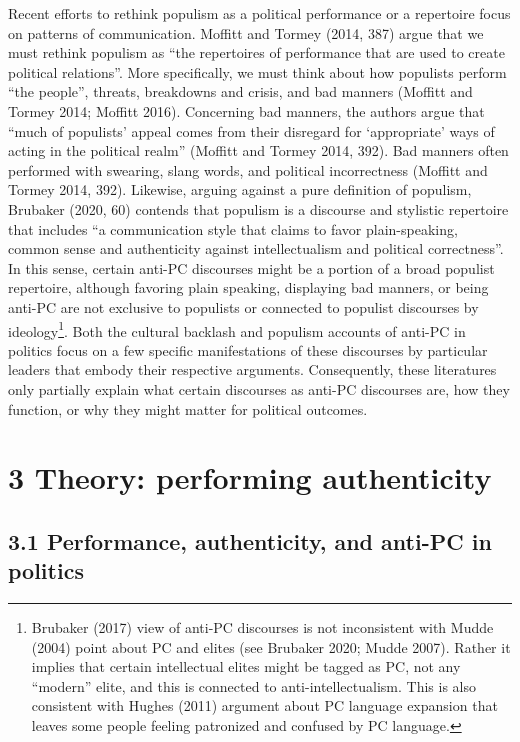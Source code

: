 \documentclass[
  12pt,
]{article}
\begin{document}
Recent efforts to rethink populism as a political performance or a
repertoire focus on patterns of communication. Moffitt and Tormey (2014,
387) argue that we must rethink populism as ``the repertoires of
performance that are used to create political relations''. More
specifically, we must think about how populists perform ``the people'',
threats, breakdowns and crisis, and bad manners (Moffitt and Tormey
2014; Moffitt 2016). Concerning bad manners, the authors argue that
``much of populists' appeal comes from their disregard for `appropriate'
ways of acting in the political realm'' (Moffitt and Tormey 2014, 392).
Bad manners often performed with swearing, slang words, and political
incorrectness (Moffitt and Tormey 2014, 392). Likewise, arguing against
a pure definition of populism, Brubaker (2020, 60) contends that
populism is a discourse and stylistic repertoire that includes ``a
communication style that claims to favor plain-speaking, common sense
and authenticity against intellectualism and political correctness''. In
this sense, certain anti-PC discourses might be a portion of a broad
populist repertoire, although favoring plain speaking, displaying bad
manners, or being anti-PC are not exclusive to populists or connected to
populist discourses by ideology\footnote{ Brubaker (2017) view of
  anti-PC discourses is not inconsistent with Mudde (2004) point about
  PC and elites (see Brubaker 2020; Mudde 2007). Rather it implies that
  certain intellectual elites might be tagged as PC, not any ``modern''
  elite, and this is connected to anti-intellectualism. This is also
  consistent with Hughes (2011) argument about PC language expansion
  that leaves some people feeling patronized and confused by PC
  language.}. Both the cultural backlash and populism accounts of
anti-PC in politics focus on a few specific manifestations of these
discourses by particular leaders that embody their respective arguments.
Consequently, these literatures only partially explain what certain
discourses as anti-PC discourses are, how they function, or why they
might matter for political outcomes.

\hypertarget{theory-performing-authenticity}{%
\section{3 Theory: performing
authenticity}\label{theory-performing-authenticity}}

\hypertarget{performance-authenticity-and-anti-pc-in-politics}{%
\subsection{3.1 Performance, authenticity, and anti-PC in
politics}\label{performance-authenticity-and-anti-pc-in-politics}}
\end{document}

